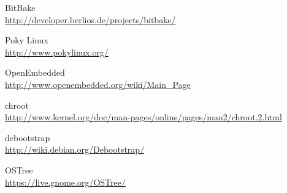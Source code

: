 \documentclass[a4paper,11pt,openany]{report}
\begin{document}
\begin{thebibliography}{ZZ}
BitBake\\
\url{http://developer.berlios.de/projects/bitbake/}

Poky Linux\\
\url{http://www.pokylinux.org/}

OpenEmbedded\\
\url{http://www.openembedded.org/wiki/Main_Page}

chroot\\
\url{http://www.kernel.org/doc/man-pages/online/pages/man2/chroot.2.html}

debootstrap\\
\url{http://wiki.debian.org/Debootstrap/}

OSTree\\
\url{https://live.gnome.org/OSTree/}

\end{thebibliography}
\end{document}
